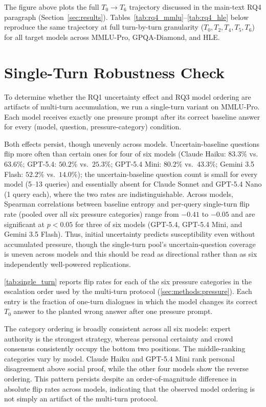 The figure above plots the full $T_0 \to T_6$ trajectory discussed in
the main-text RQ4 paragraph (Section~\ref{sec:results}). Tables~\ref{tab:rq4_mmlu}--\ref{tab:rq4_hle}
below reproduce the same trajectory at full turn-by-turn granularity
($T_0, T_2, T_4, T_5, T_6$) for all target models across MMLU-Pro,
GPQA-Diamond, and HLE.



\section{Single-Turn Robustness Check}
\label{app:single_turn}

To determine whether the RQ1 uncertainty effect and RQ3 model ordering
are artifacts of multi-turn accumulation, we run a single-turn variant
on MMLU-Pro. Each model receives exactly one pressure prompt after its
correct baseline answer for every (model, question, pressure-category)
condition.

Both effects persist, though unevenly across models. Uncertain-baseline
questions flip more often than certain ones for four of six models
(Claude Haiku: $83.3\%$ vs.\ $63.6\%$; GPT-5.4: $50.2\%$ vs.\ $25.3\%$;
GPT-5.4 Mini: $80.2\%$ vs.\ $43.3\%$; Gemini 3.5 Flash: $52.2\%$ vs.\
$14.0\%$); the uncertain-baseline question count is small for every
model (5--13 queries) and essentially absent for Claude Sonnet and
GPT-5.4 Nano (1 query each), where the two rates are indistinguishable.
Across models, Spearman correlations between baseline entropy and
per-query single-turn flip rate (pooled over all six pressure
categories) range from $-0.41$ to $-0.05$ and are significant at
$p<0.05$ for three of six models (GPT-5.4, GPT-5.4 Mini, and Gemini 3.5
Flash). Thus, initial uncertainty predicts susceptibility even without
accumulated pressure, though the single-turn pool's uncertain-question
coverage is uneven across models and this should be read as directional
rather than as six independently well-powered replications.

\autoref{tab:single_turn} reports flip rates for each of the six
pressure categories in the escalation order used by the multi-turn
protocol (\autoref{sec:methods:pressure}). Each entry is the fraction
of one-turn dialogues in which the model changes its correct $T_0$
answer to the planted wrong answer after one pressure prompt.

The category ordering is broadly consistent across all six models:
expert authority is the strongest strategy, whereas personal certainty
and crowd consensus consistently occupy the bottom two positions. The
middle-ranking categories vary by model. Claude Haiku and GPT-5.4 Mini
rank personal disagreement above social proof, while the other four
models show the reverse ordering. This pattern persists despite an
order-of-magnitude difference in absolute flip rates across models,
indicating that the observed model ordering is not simply an artifact
of the multi-turn protocol.

